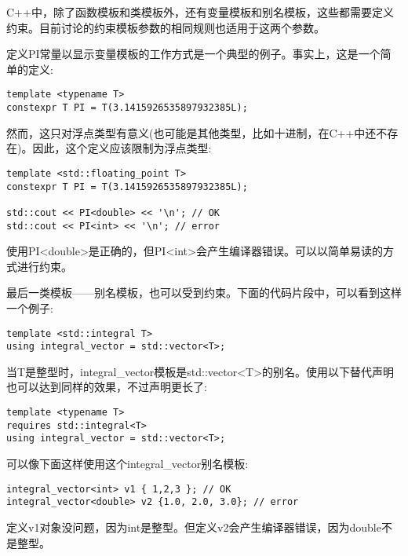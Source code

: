 C++中，除了函数模板和类模板外，还有变量模板和别名模板，这些都需要定义约束。目前讨论的约束模板参数的相同规则也适用于这两个参数。

定义PI常量以显示变量模板的工作方式是一个典型的例子。事实上，这是一个简单的定义:

\begin{lstlisting}[style=styleCXX]
template <typename T>
constexpr T PI = T(3.1415926535897932385L);
\end{lstlisting}

然而，这只对浮点类型有意义(也可能是其他类型，比如十进制，在C++中还不存在)。因此，这个定义应该限制为浮点类型:

\begin{lstlisting}[style=styleCXX]
template <std::floating_point T>
constexpr T PI = T(3.1415926535897932385L);

std::cout << PI<double> << '\n'; // OK
std::cout << PI<int> << '\n'; // error
\end{lstlisting}

使用PI<double>是正确的，但PI<int>会产生编译器错误。可以以简单易读的方式进行约束。

最后一类模板——别名模板，也可以受到约束。下面的代码片段中，可以看到这样一个例子:

\begin{lstlisting}[style=styleCXX]
template <std::integral T>
using integral_vector = std::vector<T>;
\end{lstlisting}

当T是整型时，integral\_vector模板是std::vector<T>的别名。使用以下替代声明也可以达到同样的效果，不过声明更长了:

\begin{lstlisting}[style=styleCXX]
template <typename T>
requires std::integral<T>
using integral_vector = std::vector<T>;
\end{lstlisting}

可以像下面这样使用这个integral\_vector别名模板:

\begin{lstlisting}[style=styleCXX]
integral_vector<int> v1 { 1,2,3 }; // OK
integral_vector<double> v2 {1.0, 2.0, 3.0}; // error
\end{lstlisting}

定义v1对象没问题，因为int是整型。但定义v2会产生编译器错误，因为double不是整型。

